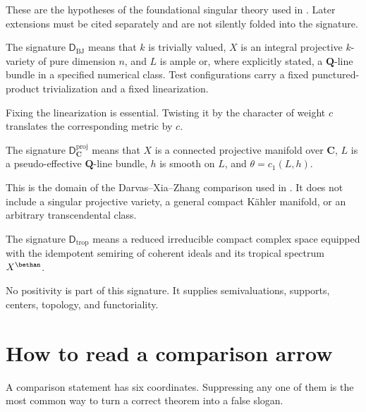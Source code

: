 These are the hypotheses of the foundational singular theory used in
.
Later extensions must be cited separately and are not silently folded into
the signature.

\begin{definition}
\label{def:dict-bj-domain}
The signature $\mathsf D_{\mathrm{BJ}}$ means that $k$ is trivially
valued, $X$ is an integral projective $k$-variety of pure dimension
$n$, and $L$ is ample or, where explicitly stated, a
$\mathbf Q$-line bundle in a specified numerical class.
Test configurations carry a fixed punctured-product trivialization and a
fixed linearization.
\end{definition}

Fixing the linearization is essential.
Twisting it by the character of weight $c$ translates the corresponding
metric by $c$.

\begin{definition}
\label{def:dict-complex-domain}
The signature $\mathsf D_{\mathbf C}^{\mathrm{proj}}$ means that
$X$ is a connected projective manifold over $\mathbf C$,
$L$ is a pseudo-effective $\mathbf Q$-line bundle,
$h$ is smooth on $L$, and $\theta=c_1(L,h)$.
\end{definition}

This is the domain of the Darvas--Xia--Zhang comparison used in
.
It does not include a singular projective variety, a general compact
K\"ahler manifold, or an arbitrary transcendental class.

\begin{definition}
\label{def:dict-mp-domain}
The signature $\mathsf D_{\mathrm{trop}}$ means a reduced irreducible
compact complex space equipped with the idempotent semiring of coherent
ideals and its tropical spectrum $X^\bethan$.
\end{definition}

No positivity is part of this signature.
It supplies semivaluations, supports, centers, topology, and functoriality.

\section{How to read a comparison arrow}
\label{sec:dict-reading-arrows}

A comparison statement has six coordinates.  Suppressing any one of them is
the most common way to turn a correct theorem into a false slogan.

